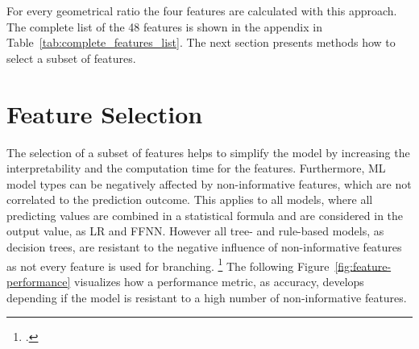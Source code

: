 For every geometrical ratio the four features are calculated with this approach.
The complete list of the 48 features is shown in the appendix in Table~\ref{tab:complete_features_list}. The next section
presents methods how to select a subset of features.

\section{Feature Selection}
\label{sec:feature_engineering}

The selection of a subset of features helps to simplify the model by increasing the interpretability and the computation time
for the features. Furthermore, \gls{ML} model types can be negatively affected by non-informative features, which are not correlated
to the prediction outcome. This applies to all models, where all predicting values are combined in a statistical formula
and are considered in the output value, as \gls{LR} and \gls{FFNN}. However all tree- and rule-based models, as decision trees, are resistant
to the negative influence of non-informative features as not every feature is used for branching. \footcite[cf.][pp. 487-489]{kuhn_applied_2016}
The following Figure~\ref{fig:feature-performance} visualizes how a performance metric, as accuracy, develops depending if the model is
resistant to a high number of non-informative features.



